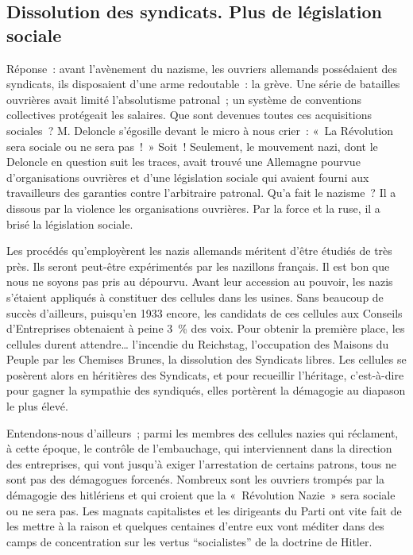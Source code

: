 \documentclass[french,twoside]{book} %
\begin{document}
\subsection[Dissolution des syndicats. Plus de législation sociale]{Dissolution des syndicats. Plus de législation sociale}
\noindent Réponse : avant l’avènement du nazisme, les ouvriers allemands possédaient des syndicats, ils disposaient d’une arme redoutable : la grève. Une série de batailles ouvrières avait limité l’absolutisme patronal ; un système de conventions collectives protégeait les salaires. Que sont devenues toutes ces acquisitions sociales ? M. Deloncle s’égosille devant le micro à nous crier : « La Révolution sera sociale ou ne sera pas ! » Soit ! Seulement, le mouvement nazi, dont le Deloncle en question suit les traces, avait trouvé une Allemagne pourvue d’organisations ouvrières et d’une législation sociale qui avaient fourni aux travailleurs des garanties contre l’arbitraire patronal. Qu’a fait le nazisme ? Il a dissous par la violence les organisations ouvrières. Par la force et la ruse, il a brisé la législation sociale.\par
Les procédés qu’employèrent les nazis allemands méritent d’être étudiés de très près. Ils seront peut-être expérimentés par les nazillons français. Il est bon que nous ne soyons pas pris au dépourvu. Avant leur accession au pouvoir, les nazis s’étaient appliqués à constituer des cellules dans les usines. Sans beaucoup de succès d’ailleurs, puisqu’en 1933 encore, les candidats de ces cellules aux Conseils d’Entreprises obtenaient à peine 3 \% des voix. Pour obtenir la première place, les cellules durent attendre… l’incendie du Reichstag, l’occupation des Maisons du Peuple par les Chemises Brunes, la dissolution des Syndicats libres. Les cellules se posèrent alors en héritières des Syndicats, et pour recueillir l’héritage, c’est-à-dire pour gagner la sympathie des syndiqués, elles portèrent la démagogie au diapason le plus élevé.\par
Entendons-nous d’ailleurs ; parmi les membres des cellules nazies qui réclament, à cette époque, le contrôle de l’embauchage, qui interviennent dans la direction des entreprises, qui vont jusqu’à exiger l’arrestation de certains patrons, tous ne sont pas des démagogues forcenés. Nombreux sont les ouvriers trompés par la démagogie des hitlériens et qui croient que la « Révolution Nazie » sera sociale ou ne sera pas. Les magnats capitalistes et les dirigeants du Parti ont vite fait de les mettre à la raison et quelques centaines d’entre eux vont méditer dans des camps de concentration sur les vertus “socialistes” de la doctrine de Hitler.
\end{document}
